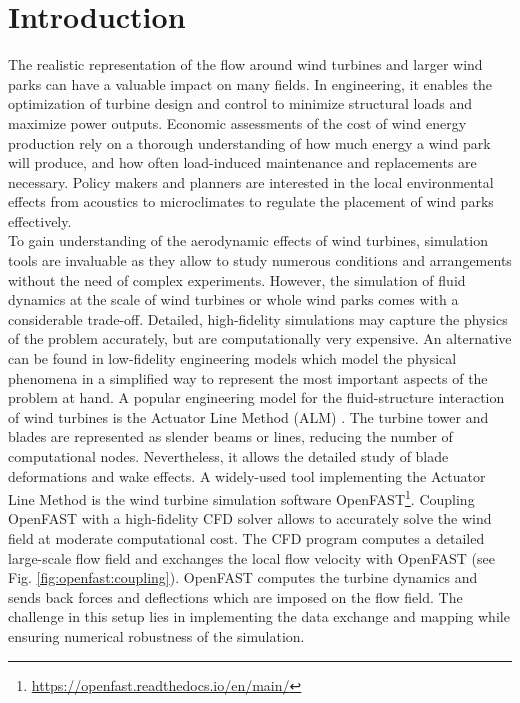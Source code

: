 \section{Introduction}
\label{section:introduction}

The realistic representation of the flow around wind turbines and larger wind parks can have a valuable impact on many fields. In engineering, it enables the optimization of turbine design and control to minimize structural loads and maximize power outputs. Economic assessments of the cost of wind energy production rely on a thorough understanding of how much energy a wind park will produce, and how often load-induced maintenance and replacements are necessary. Policy makers and planners are interested in the local environmental effects from acoustics to microclimates to regulate the placement of wind parks effectively.\\

To gain understanding of the aerodynamic effects of wind turbines, simulation tools are invaluable as they allow to study numerous conditions and arrangements without the need of complex experiments. However, the simulation of fluid dynamics at the scale of wind turbines or whole wind parks comes with a considerable trade-off. Detailed, high-fidelity simulations may capture the physics of the problem accurately, but are computationally very expensive. An alternative can be found in low-fidelity engineering models which model the physical phenomena in a simplified way to represent the most important aspects of the problem at hand. A popular engineering model for the fluid-structure interaction of wind turbines is the Actuator Line Method (ALM) \cite{Churchfield:2017}. The turbine tower and blades are represented as slender beams or lines, reducing the number of computational nodes. Nevertheless, it allows the detailed study of blade deformations and wake effects. 
A widely-used tool implementing the Actuator Line Method is the wind turbine simulation software OpenFAST\footnote{\url{https://openfast.readthedocs.io/en/main/}}. Coupling OpenFAST with a high-fidelity CFD solver allows to accurately solve the wind field at moderate computational cost. 
The CFD program computes a detailed large-scale flow field and exchanges the local flow velocity with OpenFAST (see Fig. \ref{fig:openfast:coupling}). OpenFAST computes the turbine dynamics and sends back forces and deflections which are imposed on the flow field. The challenge in this setup lies in implementing the data exchange and mapping while ensuring numerical robustness of the simulation.\\

